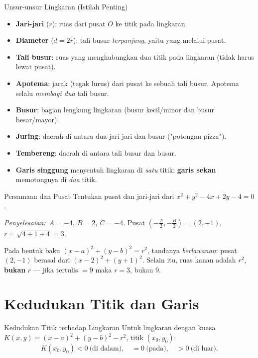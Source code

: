\documentclass[11pt,a4paper]{report}
\theoremstyle{gaya}
\newcommand{\jawab}{\par\smallskip\noindent\textit{\textcolor{oranye}{Penyelesaian:}}\ }
\begin{document}
\begin{konsep}{Unsur-unsur Lingkaran (Istilah Penting)}
\begin{itemize}[leftmargin=*,topsep=2pt]
  \item \textbf{Jari-jari} ($r$): ruas dari pusat $O$ ke titik pada lingkaran.
  \item \textbf{Diameter} ($d=2r$): tali busur \emph{terpanjang}, yaitu yang melalui pusat.
  \item \textbf{Tali busur}: ruas yang menghubungkan dua titik pada lingkaran (tidak harus lewat pusat).
  \item \textbf{Apotema}: jarak (tegak lurus) dari pusat ke sebuah tali busur. Apotema selalu \emph{membagi dua} tali busur.
  \item \textbf{Busur}: bagian lengkung lingkaran (busur kecil/minor dan busur besar/mayor).
  \item \textbf{Juring}: daerah di antara dua jari-jari dan busur ("potongan pizza").
  \item \textbf{Tembereng}: daerah di antara tali busur dan busur.
  \item \textbf{Garis singgung} menyentuh lingkaran di \emph{satu} titik; \textbf{garis sekan} memotongnya di \emph{dua} titik.
\end{itemize}
\end{konsep}

\begin{contoh}{Persamaan dan Pusat}
Tentukan pusat dan jari-jari dari $x^2+y^2-4x+2y-4=0$.

\jawab $A=-4,\ B=2,\ C=-4$. Pusat $\left(-\tfrac{A}{2},-\tfrac{B}{2}\right)=(2,-1)$,
$r=\sqrt{4+1+4}=3$.
\end{contoh}

\begin{kesalahan}
Pada bentuk baku $(x-a)^2+(y-b)^2=r^2$, tandanya \emph{berlawanan}: pusat $(2,-1)$ berasal dari $(x-2)^2+(y+1)^2$. Selain itu, ruas kanan adalah $r^2$, \textbf{bukan} $r$ --- jika tertulis $=9$ maka $r=3$, bukan $9$.
\end{kesalahan}

\section{Kedudukan Titik dan Garis}
\begin{konsep}{Kedudukan Titik terhadap Lingkaran}
Untuk lingkaran dengan kuasa $K(x,y)=(x-a)^2+(y-b)^2-r^2$, titik $(x_0,y_0)$:
\[
K(x_0,y_0)<0 \ \text{(di dalam)}, \quad
=0 \ \text{(pada)}, \quad
>0 \ \text{(di luar)}.
\]
\end{konsep}
\end{document}
